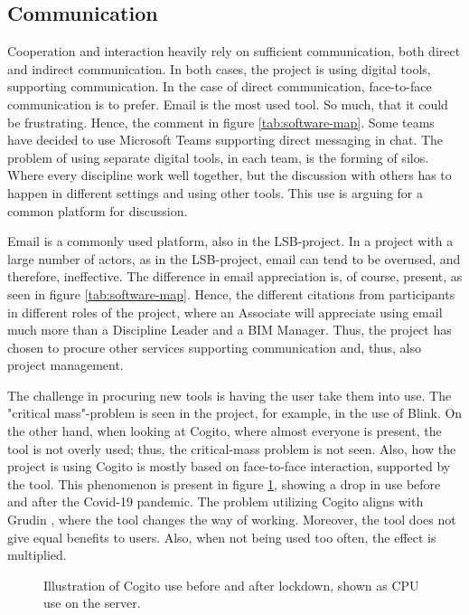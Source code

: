 \subsection{Communication}
Cooperation and interaction heavily rely on sufficient communication, both direct and indirect communication. In both cases, the project is using digital tools, supporting communication. In the case of direct communication, face-to-face communication is to prefer. Email is the most used tool. So much, that it could be frustrating. Hence, the comment in figure \ref{tab:software-map}. Some teams have decided to use Microsoft Teams supporting direct messaging in chat. The problem of using separate digital tools, in each team, is the forming of silos. Where every discipline work well together, but the discussion with others has to happen in different settings and using other tools. This use is arguing for a common platform for discussion. 

Email is a commonly used platform, also in the LSB-project. In a project with a large number of actors, as in the LSB-project, email can tend to be overused, and therefore, ineffective. The difference in email appreciation is, of course, present, as seen in figure \ref{tab:software-map}. Hence, the different citations from participants in different roles of the project, where an Associate will appreciate using email much more than a Discipline Leader and a BIM Manager. Thus, the project has chosen to procure other services supporting communication and, thus, also project management.

The challenge in procuring new tools is having the user take them into use. The "critical mass"-problem \cite{markus1987toward} is seen in the project, for example, in the use of Blink. On the other hand, when looking at Cogito, where almost everyone is present, the tool is not overly used; thus, the critical-mass problem is not seen. Also, how the project is using Cogito is mostly based on face-to-face interaction, supported by the tool. This phenomenon is present in figure \ref{fig:cogito_use}, showing a drop in use before and after the Covid-19 pandemic. The problem utilizing Cogito aligns with Grudin \cite{grudin1989groupware}, where the tool changes the way of working. Moreover, the tool does not give equal benefits to users. Also, when not being used too often, the effect is multiplied.

\begin{figure}
    \centering

    \caption{Illustration of Cogito use before and after lockdown, shown as CPU use on the server.}
    \label{fig:cogito_use}
\end{figure}

